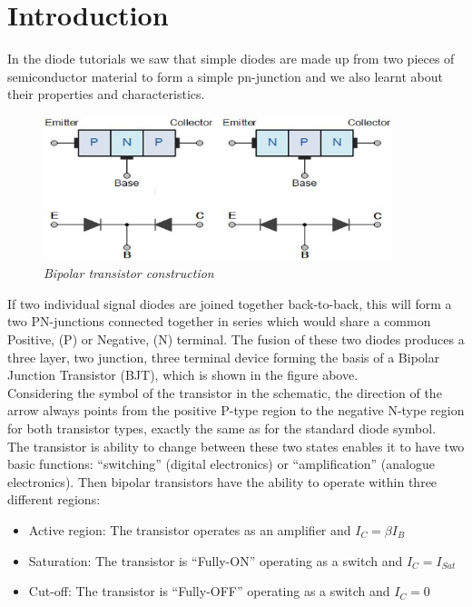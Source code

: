 \section{Introduction}
In the diode tutorials we saw that simple diodes are made up from two pieces of semiconductor material to form a simple pn-junction and we also learnt about their properties and characteristics.\\

\begin{figure}[!htp]
    \centering
    \includegraphics[width=4in]{source/picture/bai_3/BJT_1.jpg}
    \caption{\textit{Bipolar transistor construction}}
    \label{bai3_pic1}
\end{figure}

If two individual signal diodes are joined together back-to-back, this will form a two PN-junctions connected together in series which would share a common Positive, (P) or Negative, (N) terminal. The fusion of these two diodes produces a three layer, two junction, three terminal device forming the basis of a Bipolar Junction Transistor (BJT), which is shown in the figure above.\\

Considering the symbol of the transistor in the schematic, the direction of the arrow always points from the positive P-type region to the negative N-type region for both transistor types, exactly the same as for the standard diode symbol.\\

The transistor is ability to change between these two states enables it to have two basic functions: “switching” (digital electronics) or “amplification” (analogue electronics). Then bipolar transistors have the ability to operate within three different regions:
\begin{itemize}
    \item Active region: The transistor operates as an amplifier and $I_C = \beta I_B$
    \item Saturation: The transistor is “Fully-ON” operating as a switch and $I_C = I_{Sat}$
    \item Cut-off: The transistor is “Fully-OFF” operating as a switch and $I_C = 0$
\end{itemize}

